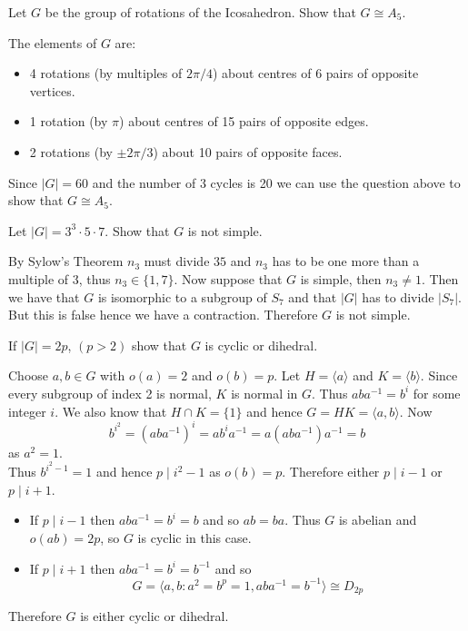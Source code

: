 \documentclass[12pt, answers]{exam}
\begin{document}
\begin{questions}
        \question Let $G$ be the group of rotations of the Icosahedron. Show that $G\cong A_5$.
        \begin{solution}
            The elements of $G$ are:
            \begin{itemize}
                \item 4 rotations (by multiples of $2\pi / 4$) about centres of 6 pairs of opposite vertices.
                \item 1 rotation  (by $\pi$) about centres of 15 pairs of opposite edges.
                \item 2 rotations (by $\pm 2\pi / 3$) about 10 pairs of opposite faces.
            \end{itemize}
            Since $|G| = 60$ and the number of 3 cycles is 20 we can use the question above to show that $G \cong A_5$.
        \end{solution}

        \question Let $|G| = 3^3 \cdot 5 \cdot 7$. Show that $G$ is not simple.
        \begin{solution}
            By Sylow's Theorem $n_3$ must divide $35$ and $n_3$ has to be one more than a multiple of 3, thus
            $n_3 \in \{ 1, 7 \}$. Now suppose that $G$ is simple, then $n_3 \neq 1$. Then we have that $G$ is isomorphic
            to a subgroup of $S_7$ and that $|G|$ has to divide $|S_7|$. But this is false hence we have a contraction. Therefore
            $G$ is not simple.
        \end{solution}

        \question If $|G| = 2p$, $(p > 2)$ show that $G$ is cyclic or dihedral.
        \begin{solution}
            Choose $a, b \in G$ with $o(a) = 2$ and $o(b) = p$. Let $H = \langle a \rangle$ and $K = \langle b \rangle$.
            Since every subgroup of index 2 is normal, $K$ is normal in $G$. Thus $aba^{-1} = b^i$ for some integer $i$.
            We also know that $H \cap K = \{1\}$ and hence $G = HK = \langle a, b \rangle$. Now
            \[ b^{i^2} = (aba^{-1})^{i} = ab^ia^{-1} = a(aba^{-1})a^{-1} = b\]
            as $a^2 = 1$.\\
            Thus $b^{i^2 - 1} = 1$ and hence $p \mathrel{|} i^2 - 1$ as $o(b) = p$. Therefore either $p \mathrel{|} i - 1$
            or $p \mathrel{|} i + 1$.
            \begin{itemize}
                \item If $p \mathrel{|} i - 1$ then $aba^{-1} = b^i = b$ and so $ab = ba$. Thus $G$ is abelian and
                $o(ab) = 2p$, so $G$ is cyclic in this case.
                \item If $p \mathrel{|} i + 1$ then $aba^{-1} = b^i = b^{-1}$ and so
                \[ G = \langle a, b \colon a^2 = b^p = 1, aba^{-1} = b^{-1} \rangle \cong D_{2p} \]
            \end{itemize}
            Therefore $G$ is either cyclic or dihedral.
        \end{solution}


\end{questions}
\end{document}
